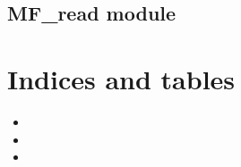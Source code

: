 \documentclass[letterpaper,10pt,english]{sphinxmanual}
\begin{document}
\begin{fulllineitems}
\label{\detokenize{MF_covariance:MF_covariance.main}}
\end{fulllineitems}



\section{MF\_read module}
\label{\detokenize{MF_read:module-MF_read}}\label{\detokenize{MF_read:mf-read-module}}\label{\detokenize{MF_read::doc}}

\begin{fulllineitems}
\label{\detokenize{MF_read:MF_read.main}}
\end{fulllineitems}



\chapter{Indices and tables}
\label{\detokenize{index:indices-and-tables}}\begin{itemize}
\item {} 

\item {} 

\item {} 

\end{itemize}


\renewcommand{\indexname}{Python Module Index}
\begin{sphinxtheindex}
\let\bigletter\sphinxstyleindexlettergroup
\bigletter{m}
\item\relax{}
\item\relax{}
\item\relax{}
\end{sphinxtheindex}

\renewcommand{\indexname}{Index}
\printindex
\end{document}
